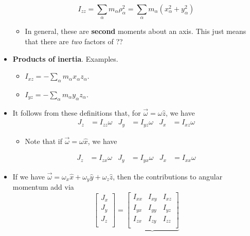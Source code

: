 \documentclass[../notes.tex]{subfiles}
\begin{document}
\begin{itemize}
    \begin{equation*}
        I_{zz} = \sum_\alpha m_\alpha\rho_\alpha^2
        = \sum_\alpha m_\alpha(x_\alpha^2+y_\alpha^2)
    \end{equation*}
    \begin{itemize}
        \item In general, these are \textbf{second} moments about an axis. This just means that there are \emph{two} factors of ??
    \end{itemize}
    \item \textbf{Products of inertia}. Examples.
    \begin{itemize}
        \item $I_{xz}=-\sum_\alpha m_\alpha x_\alpha z_\alpha$.
        \item $I_{yz}=-\sum_\alpha m_\alpha y_\alpha z_\alpha$.
    \end{itemize}
    \item It follows from these definitions that, for $\vec{\omega}=\omega\hat{z}$, we have
    \begin{align*}
        J_z &= I_{zz}\omega&
        J_y &= I_{yz}\omega&
        J_x &= I_{xz}\omega
    \end{align*}
    \begin{itemize}
        \item Note that if $\vec{\omega}=\omega\hat{x}$, we have
    \end{itemize}
    \begin{align*}
        J_z &= I_{zx}\omega&
        J_y &= I_{yx}\omega&
        J_x &= I_{xx}\omega
    \end{align*}
    \item If we have $\vec{\omega}=\omega_x\hat{x}+\omega_y\hat{y}+\omega_z\hat{z}$, then the contributions to angular momentum add via
    \begin{equation*}
        \begin{bmatrix}
            J_x\\
            J_y\\
            J_z\\
        \end{bmatrix}
        = \underbrace{
            \begin{bmatrix}
                I_{xx} & I_{xy} & I_{xz}\\
                I_{yx} & I_{yy} & I_{yz}\\
                I_{zx} & I_{zy} & I_{zz}\\
            \end{bmatrix}
}
\end{equation*}
\end{itemize}
\end{document}
